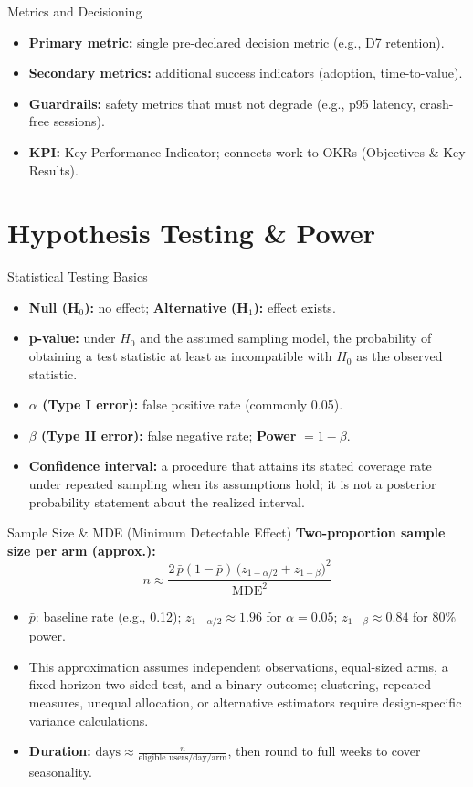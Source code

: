 \documentclass[aspectratio=169]{beamer}
\begin{document}
\begin{frame}{Metrics and Decisioning}
  \begin{itemize}
    \item \textbf{Primary metric:} single pre-declared decision metric (e.g., D7 retention).
    \item \textbf{Secondary metrics:} additional success indicators (adoption, time-to-value).
    \item \textbf{Guardrails:} safety metrics that must not degrade (e.g., p95 latency, crash-free sessions).
    \item \textbf{KPI:} Key Performance Indicator; connects work to OKRs (Objectives \& Key Results).
  \end{itemize}
\end{frame}

\section{Hypothesis Testing \& Power}
\begin{frame}{Statistical Testing Basics}
  \begin{itemize}
    \item \textbf{Null (H$_0$):} no effect; \textbf{Alternative (H$_1$):} effect exists.
    \item \textbf{p-value:} under $H_0$ and the assumed sampling model, the probability of obtaining a test statistic at least as incompatible with $H_0$ as the observed statistic.
    \item \textbf{$\alpha$ (Type I error):} false positive rate (commonly 0.05).
    \item \textbf{$\beta$ (Type II error):} false negative rate; \textbf{Power} $=1-\beta$.
    \item \textbf{Confidence interval:} a procedure that attains its stated coverage rate under repeated sampling when its assumptions hold; it is not a posterior probability statement about the realized interval.
  \end{itemize}
\end{frame}

\begin{frame}{Sample Size \& MDE (Minimum Detectable Effect)}
  \textbf{Two-proportion sample size per arm (approx.):}
  \[
    n \approx \frac{2\,\bar{p}(1-\bar{p})\,\big(z_{1-\alpha/2}+z_{1-\beta}\big)^2}{\text{MDE}^2}
  \]
  \begin{itemize}
    \item $\bar{p}$: baseline rate (e.g., 0.12); $z_{1-\alpha/2}\approx1.96$ for $\alpha=0.05$; $z_{1-\beta}\approx0.84$ for 80\% power.
    \item This approximation assumes independent observations, equal-sized arms, a fixed-horizon two-sided test, and a binary outcome; clustering, repeated measures, unequal allocation, or alternative estimators require design-specific variance calculations.
    \item \textbf{Duration:} $ \text{days} \approx \frac{n}{\text{eligible users/day/arm}} $, then round to full weeks to cover seasonality.
  \end{itemize}
\end{frame}
\end{document}
